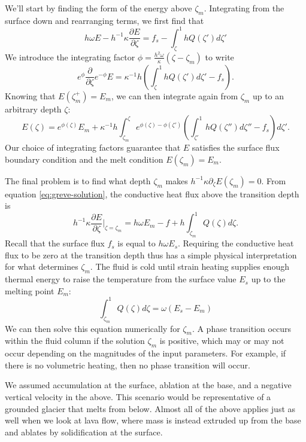 \documentclass{article}
\theoremstyle{definition}
\theoremstyle{plain}
\begin{document}
We'll start by finding the form of the energy above $\zeta_m$.
Integrating from the surface down and rearranging terms, we first find that
\begin{equation}
    h\omega E - h^{-1}\kappa\frac{\partial E}{\partial\zeta} = f_s - \int_\zeta^1 hQ(\zeta')d\zeta'
\end{equation}
We introduce the integrating factor $\phi = \frac{h^2\omega}{\kappa}(\zeta - \zeta_m)$ to write
\begin{equation}
    e^{\phi}\frac{\partial}{\partial\zeta}e^{-\phi}E = \kappa^{-1}h\left(\int_\zeta^1hQ(\zeta')d\zeta' - f_s\right).
\end{equation}
Knowing that $E(\zeta_m^+) = E_m$, we can then integrate again from $\zeta_m$ up to an arbitrary depth $\zeta$:
\begin{equation}
    E(\zeta) = e^{\phi(\zeta)}E_m + \kappa^{-1}h\int_{\zeta_m}^\zeta e^{\phi(\zeta) -\phi(\zeta')}\left(\int_{\zeta'}^1h Q(\zeta'')d\zeta'' - f_s\right)d\zeta'.
    \label{eq:greve-solution}
\end{equation}
Our choice of integrating factors guarantee that $E$ satisfies the surface flux boundary condition and the melt condition $E(\zeta_m) = E_m$.

The final problem is to find what depth $\zeta_m$ makes $h^{-1}\kappa\partial_\zeta E(\zeta_m) = 0$.
From equation \eqref{eq:greve-solution}, the conductive heat flux above the transition depth is
\begin{equation}
    h^{-1}\kappa\frac{\partial E}{\partial\zeta}\Big|_{\zeta = \zeta_m} = h\omega E_m - f + h\int_{\zeta_m}^1Q(\zeta)d\zeta.
\end{equation}
Recall that the surface flux $f_s$ is equal to $h\omega E_s$.
Requiring the conductive heat flux to be zero at the transition depth thus has a simple physical interpretation for what determines $\zeta_m$.
The fluid is cold until strain heating supplies enough thermal energy to raise the temperature from the surface value $E_s$ up to the melting point $E_m$:
\begin{equation}
    \int_{\zeta_m}^1Q(\zeta)d\zeta = \omega(E_s - E_m)
\end{equation}
We can then solve this equation numerically for $\zeta_m$.
A phase transition occurs within the fluid column if the solution $\zeta_m$ is positive, which may or may not occur depending on the magnitudes of the input parameters.
For example, if there is no volumetric heating, then no phase transition will occur.

We assumed accumulation at the surface, ablation at the base, and a negative vertical velocity in the above.
This scenario would be representative of a grounded glacier that melts from below.
Almost all of the above applies just as well when we look at lava flow, where mass is instead extruded up from the base and ablates by solidification at the surface.
\end{document}
